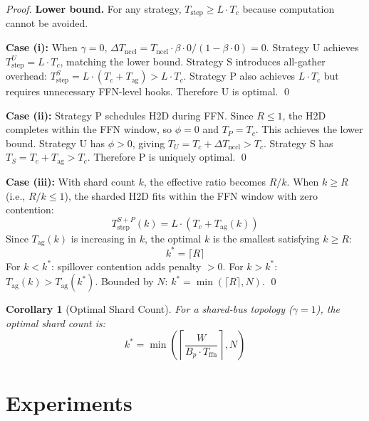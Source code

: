 \documentclass{article}
\newtheorem{corollary}[theorem]{Corollary}
\begin{document}
\begin{proof}
\textbf{Lower bound.} For any strategy, $T_{\text{step}} \geq L \cdot T_c$ because computation cannot be avoided.

\textbf{Case (i):} When $\gamma = 0$, $\Delta T_{\text{nccl}} = T_{\text{nccl}} \cdot \beta \cdot 0 / (1 - \beta \cdot 0) = 0$. Strategy U achieves $T_{\text{step}}^U = L \cdot T_c$, matching the lower bound. Strategy S introduces all-gather overhead: $T_{\text{step}}^S = L \cdot (T_c + T_{\text{ag}}) > L \cdot T_c$. Strategy P also achieves $L \cdot T_c$ but requires unnecessary FFN-level hooks. Therefore U is optimal. \qed

\textbf{Case (ii):} Strategy P schedules H2D during FFN. Since $R \leq 1$, the H2D completes within the FFN window, so $\phi = 0$ and $T_P = T_c$. This achieves the lower bound. Strategy U has $\phi > 0$, giving $T_U = T_c + \Delta T_{\text{nccl}} > T_c$. Strategy S has $T_S = T_c + T_{\text{ag}} > T_c$. Therefore P is uniquely optimal. \qed

\textbf{Case (iii):} With shard count $k$, the effective ratio becomes $R/k$. When $k \geq R$ (i.e., $R/k \leq 1$), the sharded H2D fits within the FFN window with zero contention:
\[
    T_{\text{step}}^{S+P}(k) = L \cdot (T_c + T_{\text{ag}}(k))
\]
Since $T_{\text{ag}}(k)$ is increasing in $k$, the optimal $k$ is the smallest satisfying $k \geq R$:
\[
    k^* = \lceil R \rceil
\]
For $k < k^*$: spillover contention adds penalty $> 0$. For $k > k^*$: $T_{\text{ag}}(k) > T_{\text{ag}}(k^*)$. Bounded by $N$: $k^* = \min(\lceil R \rceil, N)$. \qed
\end{proof}

\begin{corollary}[Optimal Shard Count]
\label{cor:shard}
For a shared-bus topology ($\gamma = 1$), the optimal shard count is:
\begin{equation}
    k^* = \min\left(\left\lceil \frac{W}{B_p \cdot T_{\text{ffn}}} \right\rceil, N\right)
    \label{eq:kstar}
\end{equation}
\end{corollary}

\section{Experiments}
\label{sec:experiments}
\end{document}
